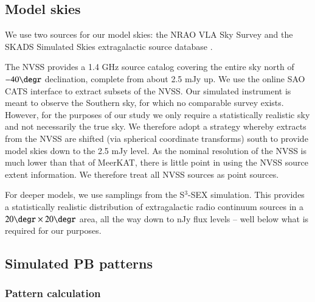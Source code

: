 \documentclass{aa}
\begin{document}

\subsection{Model skies}
\label{sec:modelskies}

We use two sources for our model skies: the NRAO VLA Sky Survey \citep[NVSS:][]{NVSS} and the SKADS Simulated Skies extragalactic source database \citep[S$^3$-SEX:][]{Wilman-simulation}. 

The NVSS provides a 1.4 GHz source catalog covering the entire sky north of $-40\degr$ declination, complete from about 2.5 mJy up. We use the online SAO CATS interface \citep{SAO-CATS} to extract subsets of the NVSS. Our simulated instrument is meant to observe the Southern sky, for which no comparable survey exists. However, for the purposes of our study we only require a statistically realistic sky and not necessarily the true sky. We therefore adopt a strategy whereby extracts from the NVSS are shifted (via spherical coordinate transforms) south to provide model skies down to the 2.5 mJy level. As the nominal resolution of the NVSS is much lower than that of MeerKAT, there is little point in using the NVSS source extent information. We therefore treat all NVSS sources as point sources. 

For deeper models, we use samplings from the S$^3$-SEX simulation. This provides a statistically realistic distribution of extragalactic radio continuum sources in a $20\degr\times20\degr$ area, all the way down to nJy flux levels -- well below what is required for our purposes.


\subsection{Simulated PB patterns}
\label{sec:emsims}

\subsubsection{Pattern calculation}
\label{sec:patcalc}
\end{document}
